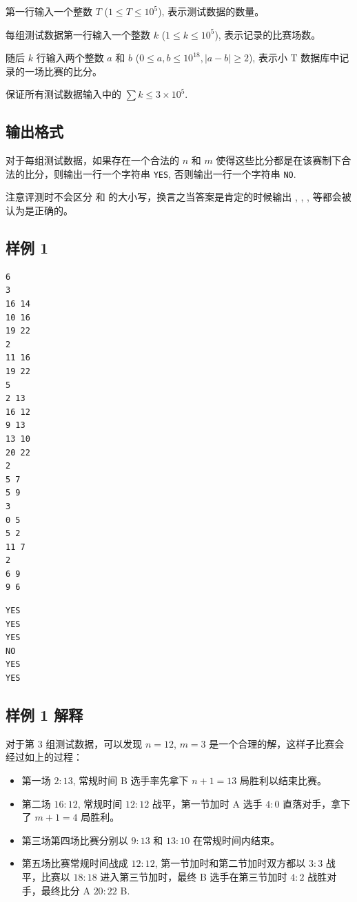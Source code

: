 第一行输入一个整数 $T$ ($1 \le T \le 10^5$), 表示测试数据的数量。

每组测试数据第一行输入一个整数 $k$ ($1 \le k \le 10^5$), 表示记录的比赛场数。

随后 $k$ 行输入两个整数 $a$ 和 $b$ ($0 \le a, b \le 10^{18}, |a - b| \ge 2$), 表示小 T 数据库中记录的一场比赛的比分。

保证所有测试数据输入中的 $\sum k \le 3 \times 10^5$.

\subsection{输出格式}

对于每组测试数据，如果存在一个合法的 $n$ 和 $m$ 使得这些比分都是在该赛制下合法的比分，则输出一行一个字符串 \texttt{YES}, 否则输出一行一个字符串 \texttt{NO}.

注意评测时不会区分  和  的大小写，换言之当答案是肯定的时候输出 , , ,  等都会被认为是正确的。

\subsection{样例 1}

\begin{minipage}{\linewidth}
	\begin{minipage}[t]{0.49\linewidth}
		\begin{lstlisting}[title=\texttt{standard input}]
6
3
16 14
10 16
19 22
2
11 16
19 22
5
2 13
16 12
9 13
13 10
20 22
2
5 7
5 9
3
0 5
5 2
11 7
2
6 9
9 6
\end{lstlisting}
	\end{minipage}
	\begin{minipage}[t]{0.49\linewidth}
		\begin{lstlisting}[title=\texttt{standard output}]
YES
YES
YES
NO
YES
YES
\end{lstlisting}
	\end{minipage}
\end{minipage}


\subsection{样例 1 解释}

对于第 $3$ 组测试数据，可以发现 $n = 12$, $m = 3$ 是一个合理的解，这样子比赛会经过如上的过程：

\begin{itemize}
	\item 第一场 $2:13$, 常规时间 B 选手率先拿下 $n + 1 = 13$ 局胜利以结束比赛。
	\item 第二场 $16:12$, 常规时间 $12:12$ 战平，第一节加时 A 选手 $4:0$ 直落对手，拿下了 $m + 1 = 4$ 局胜利。
	\item 第三场第四场比赛分别以 $9:13$ 和 $13:10$ 在常规时间内结束。
	\item 第五场比赛常规时间战成 $12:12$, 第一节加时和第二节加时双方都以 $3:3$ 战平，比赛以 $18:18$ 进入第三节加时，最终 B 选手在第三节加时 $4:2$ 战胜对手，最终比分 A $20:22$ B.
\end{itemize}





